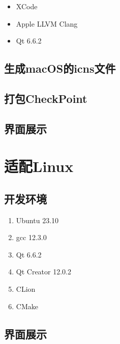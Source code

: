 \begin{itemize}
	\item XCode
	\item Apple LLVM Clang
	\item Qt 6.6.2
\end{itemize}

\subsection{生成macOS的icns文件}

\subsection{打包CheckPoint}

\subsection{界面展示}

\section{适配Linux}

\subsection{开发环境}

\begin{enumerate}
	\item Ubuntu 23.10
	\item gcc 12.3.0
	\item Qt 6.6.2
	\item Qt Creator 12.0.2
	\item CLion
	\item CMake
\end{enumerate}

\subsection{界面展示}
